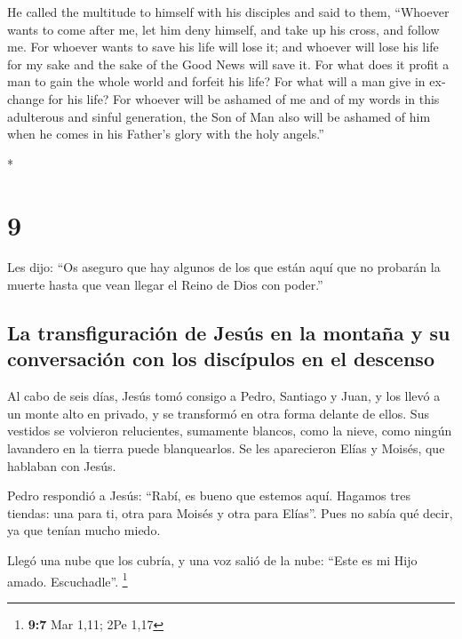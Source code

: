 \begin{paracol}{2}
\begin{otherlanguage}{english}
 He called the multitude to himself with his disciples
and said to them, ``Whoever wants to come after me, let him deny
himself, and take up his cross, and follow me.  For
whoever wants to save his life will lose it; and whoever will lose his
life for my sake and the sake of the Good News will save it.
 For what does it profit a man to gain the whole world
and forfeit his life?  For what will a man give in
exchange for his life?  For whoever will be ashamed of me
and of my words in this adulterous and sinful generation, the Son of Man
also will be ashamed of him when he comes in his Father's glory with the
holy angels.''

\end{otherlanguage}

\switchcolumn[0]*

\hypertarget{section-16}{%
\section{9}\label{section-16}}

 Les dijo: ``Os aseguro que hay algunos de los que están
aquí que no probarán la muerte hasta que vean llegar el Reino de Dios
con poder.''

\hypertarget{la-transfiguraciuxf3n-de-jesuxfas-en-la-montauxf1a-y-su-conversaciuxf3n-con-los-discuxedpulos-en-el-descenso}{%
\subsection{La transfiguración de Jesús en la montaña y su conversación
con los discípulos en el
descenso}\label{la-transfiguraciuxf3n-de-jesuxfas-en-la-montauxf1a-y-su-conversaciuxf3n-con-los-discuxedpulos-en-el-descenso}}

 Al cabo de seis días, Jesús tomó consigo a Pedro,
Santiago y Juan, y los llevó a un monte alto en privado, y se transformó
en otra forma delante de ellos.  Sus vestidos se volvieron
relucientes, sumamente blancos, como la nieve, como ningún lavandero en
la tierra puede blanquearlos.  Se les aparecieron Elías y
Moisés, que hablaban con Jesús.

 Pedro respondió a Jesús: ``Rabí, es bueno que estemos
aquí. Hagamos tres tiendas: una para ti, otra para Moisés y otra para
Elías''.  Pues no sabía qué decir, ya que tenían mucho
miedo.

 Llegó una nube que los cubría, y una voz salió de la
nube: ``Este es mi Hijo amado. Escuchadle''. \footnote{\textbf{9:7} Mar
  1,11; 2Pe 1,17}


\end{paracol}
